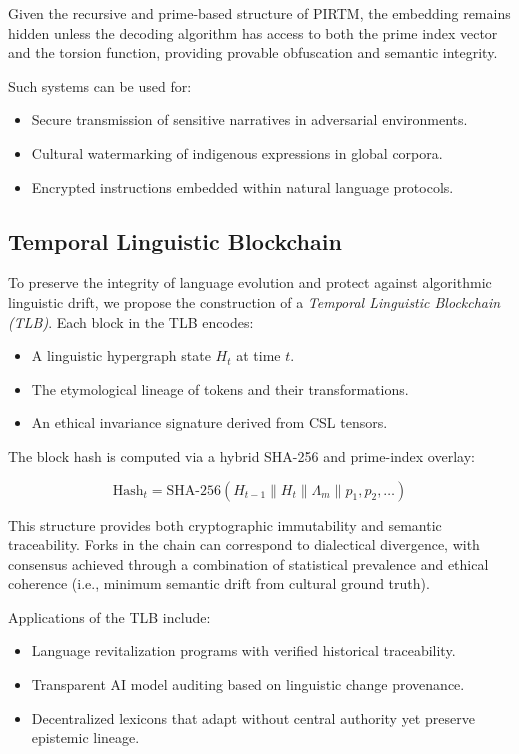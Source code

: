 \documentclass{article}
\theoremstyle{plain}
\theoremstyle{claimstyle}
\begin{document}
Given the recursive and prime-based structure of PIRTM, the embedding remains hidden unless the decoding algorithm has access to both the prime index vector and the torsion function, providing provable obfuscation and semantic integrity.

Such systems can be used for:
\begin{itemize}
    \item Secure transmission of sensitive narratives in adversarial environments.
    \item Cultural watermarking of indigenous expressions in global corpora.
    \item Encrypted instructions embedded within natural language protocols.
\end{itemize}

\subsection{Temporal Linguistic Blockchain}

To preserve the integrity of language evolution and protect against algorithmic linguistic drift, we propose the construction of a \textit{Temporal Linguistic Blockchain (TLB)}. Each block in the TLB encodes:

\begin{itemize}
    \item A linguistic hypergraph state $H_t$ at time $t$.
    \item The etymological lineage of tokens and their transformations.
    \item An ethical invariance signature derived from CSL tensors.
\end{itemize}

The block hash is computed via a hybrid SHA-256 and prime-index overlay:

\[
\text{Hash}_t = \text{SHA-256}(H_{t-1} \| H_t \| \Lambda_m \| p_1, p_2, \dots)
\]

This structure provides both cryptographic immutability and semantic traceability. Forks in the chain can correspond to dialectical divergence, with consensus achieved through a combination of statistical prevalence and ethical coherence (i.e., minimum semantic drift from cultural ground truth).

Applications of the TLB include:
\begin{itemize}
    \item Language revitalization programs with verified historical traceability.
    \item Transparent AI model auditing based on linguistic change provenance.
    \item Decentralized lexicons that adapt without central authority yet preserve epistemic lineage.
\end{itemize}
\end{document}
